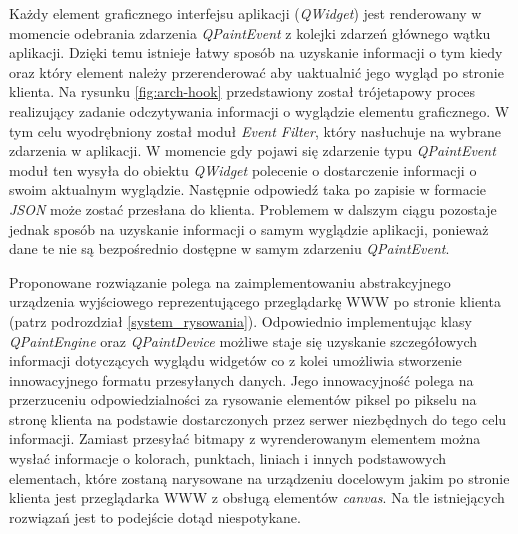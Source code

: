 
Każdy element graficznego interfejsu aplikacji (\emph{QWidget}) jest renderowany w momencie odebrania zdarzenia \emph{QPaintEvent} z kolejki zdarzeń głównego wątku aplikacji. Dzięki temu istnieje łatwy sposób na uzyskanie informacji o tym kiedy oraz który element należy przerenderować aby uaktualnić jego wygląd po stronie klienta. Na rysunku \ref{fig:arch-hook} przedstawiony został trójetapowy proces realizujący zadanie odczytywania informacji o wyglądzie elementu graficznego. 
W tym celu wyodrębniony został moduł \emph{Event Filter}, który nasłuchuje na wybrane zdarzenia w aplikacji. W momencie gdy pojawi się zdarzenie typu \emph{QPaintEvent} moduł ten wysyła do obiektu \emph{QWidget} polecenie o dostarczenie informacji o swoim aktualnym wyglądzie. Następnie odpowiedź taka po zapisie w formacie \emph{JSON} może zostać przesłana do klienta. Problemem w dalszym ciągu pozostaje jednak sposób na uzyskanie informacji o samym wyglądzie aplikacji, ponieważ dane te nie są bezpośrednio dostępne w samym zdarzeniu \emph{QPaintEvent}.

Proponowane rozwiązanie polega na zaimplementowaniu abstrakcyjnego urządzenia wyjściowego reprezentującego przeglądarkę WWW po stronie klienta (patrz podrozdział \ref{system_rysowania}). Odpowiednio implementując klasy \emph{QPaintEngine} oraz \emph{QPaintDevice} możliwe staje się uzyskanie szczegółowych informacji dotyczących wyglądu widgetów co z kolei umożliwia stworzenie innowacyjnego formatu przesyłanych danych. Jego innowacyjność polega na przerzuceniu odpowiedzialności za rysowanie elementów piksel po pikselu na stronę klienta na podstawie dostarczonych przez serwer niezbędnych do tego celu informacji. Zamiast przesyłać bitmapy z wyrenderowanym elementem można wysłać informacje o kolorach, punktach, liniach i innych podstawowych elementach, które zostaną narysowane na urządzeniu docelowym jakim po stronie klienta jest przeglądarka WWW z obsługą elementów \emph{canvas}. Na tle istniejących rozwiązań jest to podejście dotąd niespotykane.
